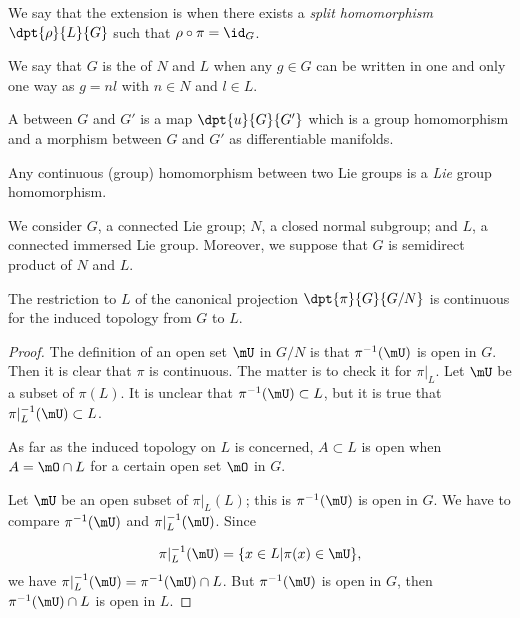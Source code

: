 We say that the extension is  when there exists a \emph{split homomorphism} $\dpt{\rho}{L}{G}$ such that $\rho\circ\pi=\id_G$.

\begin{definition}
We say that $G$ is the  of $N$ and $L$ when any $g\in G$ can be written in one and only one way as $g=nl$ with $n\in N$ and $l\in L$.
\end{definition}


\begin{definition}
A  between $G$ and $G'$ is a map $\dpt{u}{G}{G'}$ which is a group homomorphism and a morphism between $G$ and $G'$ as differentiable manifolds.
\end{definition}

\begin{lemma}
Any continuous (group) homomorphism between two Lie groups is a \emph{Lie} group homomorphism.
\end{lemma}

We consider $G$, a connected Lie group; $N$, a closed normal subgroup; and $L$, a connected immersed Lie group. Moreover, we suppose that $G$ is semidirect product of $N$ and $L$.

\begin{proposition}
The restriction to $L$ of the canonical projection $\dpt{\pi}{G}{G/N}$ is continuous for the induced topology from $G$ to $L$.
\end{proposition}
\begin{proof}
      The definition of an open set $\mU$ in $G/N$ is that $\pi^{-1}(\mU)$ is open in $G$. Then it is clear that $\pi$ is continuous. The matter is to check it for $\pi|_L$. Let $\mU$ be a subset of $\pi(L)$. It is unclear that $\pi^{-1}(\mU)\subset L$, but it is true that $\pi|_L^{-1}(\mU)\subset L$.

      As far as the induced topology on $L$ is concerned, $A\subset L$ is open when $A=\mO\cap L$ for a certain open set $\mO$ in $G$.

      Let $\mU$ be an open subset of $\pi|_L(L)$; this is $\pi^{-1}(\mU)$ is open in $G$. We have to compare $\pi^{-1}(\mU)$ and $\pi|_L^{-1}(\mU)$. Since

    \[
        \pi|_L^{-1}(\mU)=\{x\in L|\pi(x)\in\mU\},
    \]
    we have $\pi|_L^{-1}(\mU)=\pi^{-1}(\mU)\cap L$. But $\pi^{-1}(\mU)$ is open in $G$, then $\pi^{-1}(\mU)\cap L$ is open in $L$.
\end{proof}

